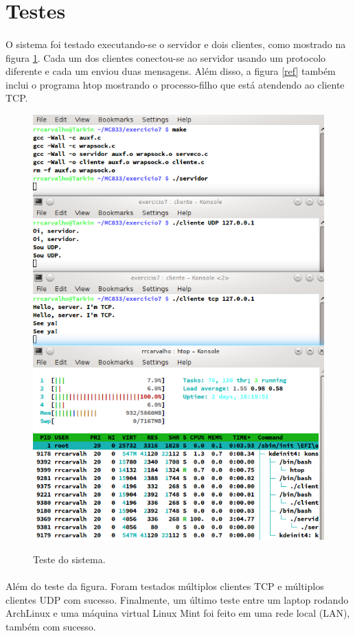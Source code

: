 \documentclass[a4paper,10pt,oneside,final,titlepage,onecolumn]{article}
\begin{document}
\FloatBarrier
\section{Testes}
\paragraph{}O sistema foi testado executando-se o servidor e dois clientes, como mostrado na figura \ref{teste}. Cada um dos clientes conectou-se ao servidor usando um protocolo diferente e cada um enviou duas mensagens. Além disso, a figura \ref{ref} também inclui o programa htop mostrando o processo-filho que está atendendo ao cliente TCP.
\begin{figure}[!ht]
  \caption{Teste do sistema.}
  \centering
  \includegraphics[width=117mm]{images/teste.png}
  \label{teste}
\end{figure}
\paragraph{}Além do teste da figura. Foram testados múltiplos clientes TCP e múltiplos clientes UDP com sucesso. Finalmente, um último teste entre um laptop rodando ArchLinux e uma máquina virtual Linux Mint foi feito em uma rede local (LAN), também com sucesso.
\end{document}
